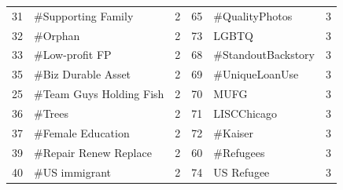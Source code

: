 \begin{longtable}{|r|l|l|r|l|l|}
	31                                & \#Supporting Family                & 2                                                       & 65                               & \#QualityPhotos                     & 3                                                      \\
	32                                & \#Orphan                           & 2                                                       & 73                               & LGBTQ                               & 3                                                      \\
	33                                & \#Low-profit FP                    & 2                                                       & 68                               & \#StandoutBackstory                 & 3                                                      \\
	35                                & \#Biz Durable Asset                & 2                                                       & 69                               & \#UniqueLoanUse                     & 3                                                      \\
	25                                & \#Team Guys Holding Fish           & 2                                                       & 70                               & MUFG                                & 3                                                      \\
	36                                & \#Trees                            & 2                                                       & 71                               & LISCChicago                         & 3                                                      \\
	37                                & \#Female Education                 & 2                                                       & 72                               & \#Kaiser                            & 3                                                      \\
	39                                & \#Repair Renew Replace             & 2                                                       & 60                               & \#Refugees                          & 3                                                      \\
	40                                & \#US immigrant                     & 2                                                       & 74                               & US Refugee                          & 3                                                      \\

\end{longtable}
